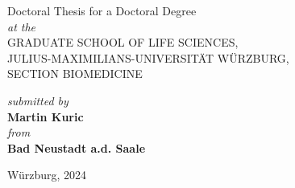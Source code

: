 \begin{titlepage}
    \vspace{\vfull}
    {\large Doctoral Thesis for a Doctoral Degree } \\
    \vspace{\vhalf}
    \textit{at the} \\
    \vspace{\vhalf}
    \MakeUppercase{Graduate School of Life Sciences, \\
        Julius-Maximilians-Universität Würzburg, \\
        Section Biomedicine}


    \vspace{\vhalf}
    \textit{submitted by} \\
    \vspace{\vhalf}
    {\Large \textbf{Martin Kuric}} \\
    \vspace{\vhalf}
    \textit{from} \\
    \vspace{\vhalf}
    \textbf{Bad Neustadt a.d. Saale}

    \vfill
    Würzburg, {\large 2024}

\end{titlepage}






